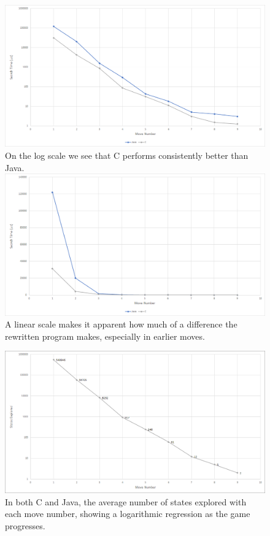 \documentclass{article}
\begin{document}
\begin{figure}[H]
	\centering
	\includegraphics[width=\linewidth]{Log.png}
	On the log scale we see that C performs consistently better than Java.
	\includegraphics[width=\linewidth]{Linear.png}
	A linear scale makes it apparent how much of a difference the rewritten program makes, especially in earlier moves.
\end{figure}
\begin{figure}[H]
	\centering
	\includegraphics[width=\linewidth]{States.png}
	In both C and Java, the average number of states explored with each move number, showing a logarithmic regression as the game progresses.
\end{figure}
\end{document}
